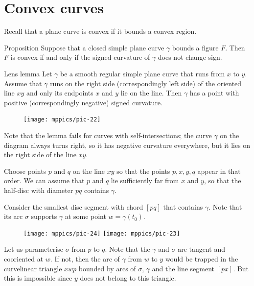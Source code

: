 \section*{Convex curves}

Recall that a plane curve is convex if it bounds a convex region.

\begin{thm}{Proposition}\label{prop:convex}
Suppose that a closed simple plane curve $\gamma$ bounds a figure $F$.
Then $F$ is convex if and only if the signed curvature of $\gamma$ does not change sign.
\end{thm}


\begin{thm}{Lens lemma}\label{lem:lens}
Let $\gamma$ be a smooth regular simple plane curve that runs from $x$ to $y$.
Assume that $\gamma$ runs on the right side (correspondingly left side) of the oriented line $xy$ and only its endpoints $x$ and $y$ lie on the line.
Then $\gamma$ has a point with positive (correspondingly negative) signed curvature.
\end{thm}

\begin{figure}
\vskip-4mm
\centering
\texttt{[image: mppics/pic-22]}
\vskip0mm
\end{figure}

Note that the lemma fails for curves with self-intersections;
the curve $\gamma$ on the diagram always turns right, 
so it has negative curvature everywhere, but it lies on the right side of the line $xy$.

Choose points $p$ and $q$ on the line $xy$
so that the points $p, x, y, q$ appear in that order.
We can assume that $p$ and $q$ lie sufficiently far from $x$ and $y$, so that the half-disc with diameter $pq$ contains $\gamma$.

Consider the smallest disc segment with chord $[pq]$ that contains $\gamma$.
Note that its arc $\sigma$ supports $\gamma$ at some point $w=\gamma(t_0)$.

\begin{figure}
\centering
\texttt{[image: mppics/pic-24]}
\bigskip
\texttt{[image: mppics/pic-23]}
\end{figure}

Let us parameterise $\sigma$ from $p$ to $q$.
Note that the $\gamma$ and $\sigma$ are tangent and cooriented at $w$.
If not, then the arc of $\gamma$ from $w$ to $y$ would be trapped in the curvelinear triangle $xwp$ bounded by arcs of $\sigma$, $\gamma$ and the line segment $[px]$.
But this is impossible since $y$ does not belong to this triangle.

